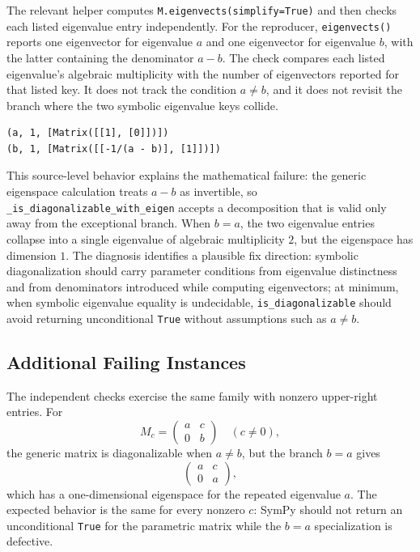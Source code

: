 \documentclass[11pt]{article}
\begin{document}
The relevant helper computes \texttt{M.eigenvects(simplify=True)} and then checks each listed eigenvalue entry independently. For the reproducer, \texttt{eigenvects()} reports one eigenvector for eigenvalue \(a\) and one eigenvector for eigenvalue \(b\), with the latter containing the denominator \(a-b\). The check compares each listed eigenvalue's algebraic multiplicity with the number of eigenvectors reported for that listed key. It does not track the condition \(a\ne b\), and it does not revisit the branch where the two symbolic eigenvalue keys collide.

\begin{lstlisting}[style=bugpython]
(a, 1, [Matrix([[1], [0]])])
(b, 1, [Matrix([[-1/(a - b)], [1]])])
\end{lstlisting}

This source-level behavior explains the mathematical failure: the generic eigenspace calculation treats \(a-b\) as invertible, so \texttt{\_is\_diagonalizable\_with\_eigen} accepts a decomposition that is valid only away from the exceptional branch. When \(b=a\), the two eigenvalue entries collapse into a single eigenvalue of algebraic multiplicity \(2\), but the eigenspace has dimension \(1\). The diagnosis identifies a plausible fix direction: symbolic diagonalization should carry parameter conditions from eigenvalue distinctness and from denominators introduced while computing eigenvectors; at minimum, when symbolic eigenvalue equality is undecidable, \texttt{is\_diagonalizable} should avoid returning unconditional \texttt{True} without assumptions such as \(a\ne b\).

\subsection{Additional Failing Instances}

The independent checks exercise the same family with nonzero upper-right entries. For
\[
M_c=\begin{pmatrix}a&c\\0&b\end{pmatrix}\quad(c\ne 0),
\]
the generic matrix is diagonalizable when \(a\ne b\), but the branch \(b=a\) gives
\[
\begin{pmatrix}a&c\\0&a\end{pmatrix},
\]
which has a one-dimensional eigenspace for the repeated eigenvalue \(a\). The expected behavior is the same for every nonzero \(c\): SymPy should not return an unconditional \texttt{True} for the parametric matrix while the \(b=a\) specialization is defective.
\end{document}
